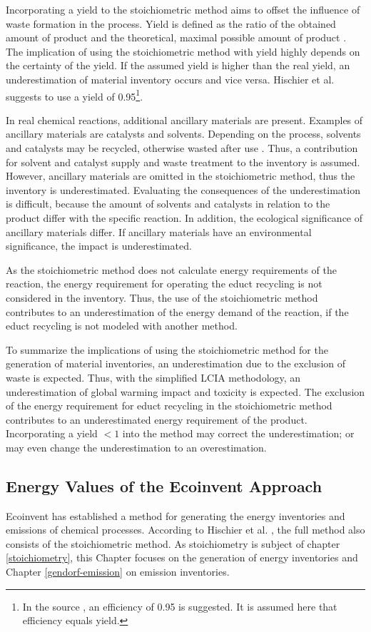 Incorporating a yield  \cite{Parvatker.2019} to the stoichiometric method aims to offset the influence of waste formation in the process. Yield is defined as the ratio of the obtained amount of product and the theoretical, maximal possible amount of product  \cite{Christen.2010}. The implication of using the stoichiometric method with yield highly depends on the certainty of the yield. If the assumed yield is higher than the real yield, an underestimation of material inventory occurs and vice versa. Hischier et al.  \cite{Hischier.2005} suggests to use a yield of 0.95\footnote{In the source \cite{Hischier.2005}, an efficiency of 0.95 is suggested. It is assumed here that efficiency equals yield.}.

In real chemical reactions, additional ancillary materials are present. Examples of ancillary materials are catalysts and solvents. Depending on the process, solvents and catalysts may be recycled, otherwise wasted after use  \cite{Piccinno.2016}. Thus, a contribution for solvent and catalyst supply and waste treatment to the inventory is assumed. However, ancillary materials are omitted in the stoichiometric method, thus the inventory is underestimated. Evaluating the consequences of the underestimation is difficult, because the amount of solvents and catalysts in relation to the product differ with the specific reaction. In addition, the ecological significance of ancillary materials differ. If ancillary materials have an environmental significance, the impact is underestimated. 

As the stoichiometric method does not calculate energy requirements of the reaction, the energy requirement for operating the educt recycling is not considered in the inventory. Thus, the use of the stoichiometric method contributes to an underestimation of the energy demand of the reaction, if the educt recycling is not modeled with another method. 

To summarize the implications of using the stoichiometric method for the generation of material inventories, an underestimation due to the exclusion of waste is expected. Thus, with the simplified LCIA methodology, an underestimation of global warming impact and toxicity is expected. The exclusion of the energy requirement for educt recycling in the stoichiometric method contributes to an underestimated energy requirement of the product. Incorporating a yield $<1$ into the method may correct the underestimation; or may even change the underestimation to an overestimation.

\subsection{Energy Values of the Ecoinvent Approach}
\label{gendorf}
Ecoinvent has established a method for generating the energy inventories and emissions of chemical processes. According to Hischier et al. \cite{Hischier.2005}, the full method also consists of the stoichiometric method. As stoichiometry is subject of chapter \ref{stoichiometry}, this Chapter focuses on the generation of energy inventories and Chapter \ref{gendorf-emission} on emission inventories.

